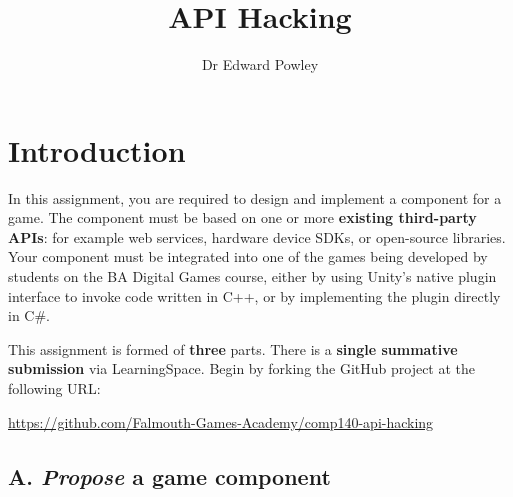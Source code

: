 \documentclass{../fal_assignment}
\title{API Hacking}
\author{Dr Edward Powley}
\begin{document}
\maketitle
%    
\section*{Introduction}

In this assignment, you are required to design and implement a component for a game.
The component must be based on one or more \textbf{existing third-party APIs}:
for example web services, hardware device SDKs, or open-source libraries.
Your component must be integrated into one of the games being developed by students on the BA Digital Games course,
either by using Unity's native plugin interface to invoke code written in C++,
or by implementing the plugin directly in C\#.

This assignment is formed of \textbf{three} parts.
There is a \textbf{single summative submission} via LearningSpace.
Begin by forking the GitHub project at the following URL:
\begin{center}
\url{https://github.com/Falmouth-Games-Academy/comp140-api-hacking}
\end{center}

\subsection*{A. \emph{Propose} a game component}
\end{document}
